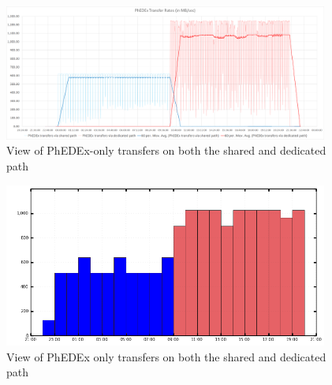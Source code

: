 \begin{figure}[h]
  \centering
  \includegraphics[width=0.95\textwidth]{Figures/FileDownload_All_paths.png}
  \caption{View of PhEDEx-only transfers on both the shared and dedicated path}
  \label{fig:combined_transfers}
\end{figure} 

\begin{figure}[h]
  \centering
  \includegraphics[width=0.95\textwidth]{Figures/FileDownload_PhEDEx_all_paths.png}
  \caption{View of PhEDEx only transfers on both the shared and dedicated path}
  \label{fig:combined_phedex_transfers}
\end{figure} 